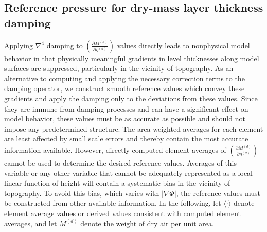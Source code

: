 \documentclass{agujournal}
\begin{document}
\subsection{Reference pressure for dry-mass layer thickness damping}\label{app:ref_dp}
Applying $\nabla^4$ damping to $\left( \frac{\partial M^{(d)}}{\partial \eta^{(d)}}\right)$ values directly leads to nonphysical model behavior in that physically meaningful gradients in level thicknesses along model surfaces are suppressed, particularly in the vicinity of topography. As an alternative to computing and applying the necessary correction terms to the damping operator, we construct smooth reference values which convey these gradients and apply the damping only to the deviations from these values. Since they are immune from damping processes and can have a significant effect on model behavior, these values must be as accurate as possible and should not impose any predetermined structure. The area weighted averages for each element are least affected by small scale errors and thereby contain the most accurate information available. However, directly computed element averages of $\left( \frac{\partial M^{(d)}}{\partial \eta^{(d)}}\right)$ cannot be used to determine the desired reference values. Averages of this variable or any other variable that cannot be adequately represented as a local linear function of height will contain a systematic bias in the vicinity of topography. To avoid this bias, which varies with $\left| \nabla \Phi\right|$, the reference values must be constructed from other available information. In the following, let $\langle \cdot \rangle$ denote element average values or derived values consistent with computed element averages, and let $M^{(d)}$ denote the weight of dry air per unit area.
\end{document}
